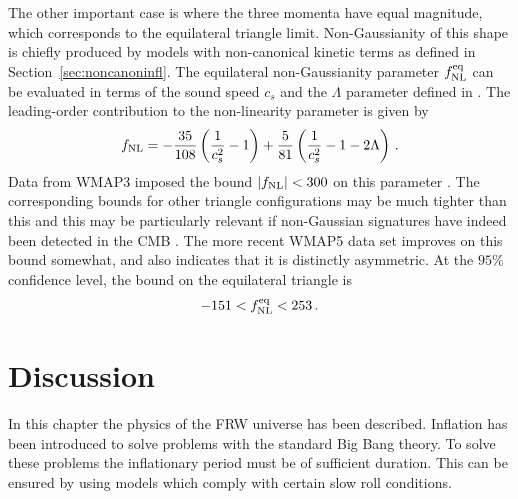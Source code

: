 The other important case is   
where the three momenta have equal magnitude, which corresponds to the
equilateral triangle limit. Non-Gaussianity of this shape is chiefly produced
by models with non-canonical kinetic terms as defined in
Section~\ref{sec:noncanoninfl}. The equilateral non-Gaussianity parameter
$f_{\mathrm{NL}}^{\mathrm{eq}}$ can be evaluated in terms of the sound speed $c_s$ and the
$\Lambda$ parameter defined in .
The leading-order contribution to the
non-linearity 
parameter is given by \cite{chenetal,lidser3}
% 
\begin{equation} 
\label{eq:fnldefn-dbiintro}
 f_{\mathrm{NL}} = -\frac{35}{108}\left(\frac{1}{c_s^2} -1 \right) +
\frac{5}{81}\left( \frac{1}{c_s^2} -1 -2\Lambda \right) \,.
\end{equation}
%  
Data from WMAP3 imposed the bound $|f_{\mathrm{NL}}| < 300$ on this parameter
\cite{spergel}. The corresponding bounds for other triangle configurations 
may be much tighter than this and this may be particularly relevant if 
non-Gaussian signatures have indeed been detected in the 
CMB \cite{Yadav:2007yy,crim}. The more recent WMAP5 data set
\cite{Komatsu:2008hk} improves on this bound somewhat, and
also indicates that it is distinctly asymmetric. At the $95 \%$ confidence
level, the bound on the 
equilateral triangle is 
% 
\begin{equation}
\label{eq:fnleq-wmap5-intro}
 -151<f_{\mathrm{NL}}^{\mathrm{eq}}<253\,.
\end{equation}
% 


\section{Discussion}
\label{sec:disc-intro}

In this chapter the physics of the FRW universe has been described. Inflation has been introduced
to solve problems with the standard Big Bang theory. To solve these problems the inflationary
period must be of sufficient duration. This can be ensured by using models which comply with
certain slow roll conditions. 

